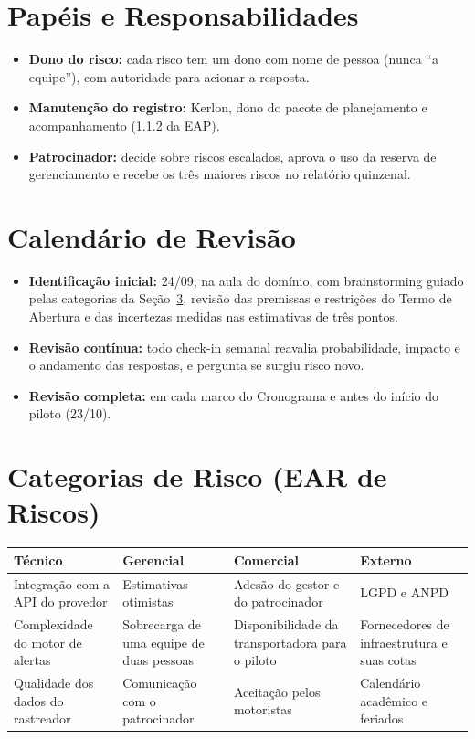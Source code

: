 \documentclass[11pt,a4paper]{article}
\begin{document}
\section{Papéis e Responsabilidades}
\begin{itemize}[itemsep=2pt]
  \item \textbf{Dono do risco:} cada risco tem um dono com nome de pessoa (nunca ``a equipe''), com autoridade para acionar a resposta.
  \item \textbf{Manutenção do registro:} Kerlon, dono do pacote de planejamento e acompanhamento (1.1.2 da EAP).
  \item \textbf{Patrocinador:} decide sobre riscos escalados, aprova o uso da reserva de gerenciamento e recebe os três maiores riscos no relatório quinzenal.
\end{itemize}

\section{Calendário de Revisão}
\begin{itemize}[itemsep=2pt]
  \item \textbf{Identificação inicial:} 24/09, na aula do domínio, com brainstorming guiado pelas categorias da Seção~\ref{ris:categorias}, revisão das premissas e restrições do Termo de Abertura e das incertezas medidas nas estimativas de três pontos.
  \item \textbf{Revisão contínua:} todo check-in semanal reavalia probabilidade, impacto e o andamento das respostas, e pergunta se surgiu risco novo.
  \item \textbf{Revisão completa:} em cada marco do Cronograma e antes do início do piloto (23/10).
\end{itemize}

\section{Categorias de Risco (EAR de Riscos)}\label{ris:categorias}
\begin{center}
\small
\begin{tabularx}{\textwidth}{L L L L}
\toprule
\textbf{Técnico} & \textbf{Gerencial} & \textbf{Comercial} & \textbf{Externo} \\
\midrule
Integração com a API do provedor & Estimativas otimistas & Adesão do gestor e do patrocinador & LGPD e ANPD \\
Complexidade do motor de alertas & Sobrecarga de uma equipe de duas pessoas & Disponibilidade da transportadora para o piloto & Fornecedores de infraestrutura e suas cotas \\
Qualidade dos dados do rastreador & Comunicação com o patrocinador & Aceitação pelos motoristas & Calendário acadêmico e feriados \\
\bottomrule
\end{tabularx}
\end{center}
\end{document}
